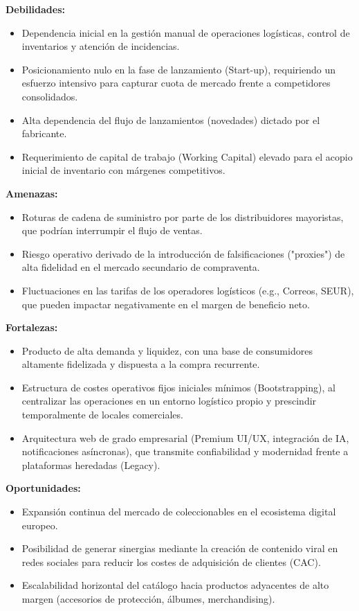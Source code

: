 \documentclass[12pt,a4paper]{article}
\begin{document}
\textbf{Debilidades:}
\begin{itemize}
    \item Dependencia inicial en la gestión manual de operaciones logísticas, control de inventarios y atención de incidencias.
    \item Posicionamiento nulo en la fase de lanzamiento (Start-up), requiriendo un esfuerzo intensivo para capturar cuota de mercado frente a competidores consolidados.
    \item Alta dependencia del flujo de lanzamientos (novedades) dictado por el fabricante.
    \item Requerimiento de capital de trabajo (Working Capital) elevado para el acopio inicial de inventario con márgenes competitivos.
\end{itemize}

\textbf{Amenazas:}
\begin{itemize}
    \item Roturas de cadena de suministro por parte de los distribuidores mayoristas, que podrían interrumpir el flujo de ventas.
    \item Riesgo operativo derivado de la introducción de falsificaciones ("proxies") de alta fidelidad en el mercado secundario de compraventa.
    \item Fluctuaciones en las tarifas de los operadores logísticos (e.g., Correos, SEUR), que pueden impactar negativamente en el margen de beneficio neto.
\end{itemize}

\textbf{Fortalezas:}
\begin{itemize}
    \item Producto de alta demanda y liquidez, con una base de consumidores altamente fidelizada y dispuesta a la compra recurrente.
    \item Estructura de costes operativos fijos iniciales mínimos (Bootstrapping), al centralizar las operaciones en un entorno logístico propio y prescindir temporalmente de locales comerciales.
    \item Arquitectura web de grado empresarial (Premium UI/UX, integración de IA, notificaciones asíncronas), que transmite confiabilidad y modernidad frente a plataformas heredadas (Legacy).
\end{itemize}

\textbf{Oportunidades:}
\begin{itemize}
    \item Expansión continua del mercado de coleccionables en el ecosistema digital europeo.
    \item Posibilidad de generar sinergias mediante la creación de contenido viral en redes sociales para reducir los costes de adquisición de clientes (CAC).
    \item Escalabilidad horizontal del catálogo hacia productos adyacentes de alto margen (accesorios de protección, álbumes, merchandising).
\end{itemize}
\end{document}
